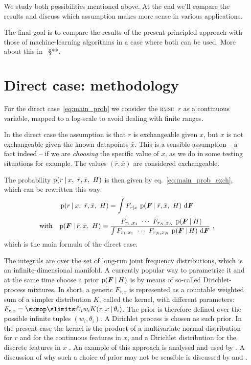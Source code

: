 \documentclass[\ifafour a4paper,12pt,\else a5paper,10pt,\fi%
onecolumn,oneside,article,%
british%
]{memoir}
\makeatletter
\theoremstyle{remark}
\theoremstyle{innote}
\def\sum{\DOTSI\sumop\slimits@}
\newcommand*{\di}{\mathrm{d}}%
\newcommand*{\p}{\mathrm{p}}%
\renewcommand*{\|}[1][]{\nonscript\:#1\vert\nonscript\:\mathopen{}}
\renewcommand*{\=}{\TextOrMath\texteq\eq}
\newcommand*{\sect}{\S}%
\newcommand*{\eqn}{eq.}%
\newcommand*{\wrench}{{\fontencoding{U}\fontfamily{fontawesomethree}\selectfont\symbol{114}}}
\newcommand{\mynote}[1]{ {\color{notecolour}#1}}
\newcommand*{\rmsd}{\textsc{rmsd}}
\newcommand*{\ro}{r}
\newcommand*{\xo}{x}
\newcommand*{\rd}{\bar{r}}
\newcommand*{\xd}{\bar{x}}
\newcommand*{\yF}{\bm{F}}
\makeatother
\begin{document}
We study both possibilities mentioned above. At the end we'll compare the
results and discuss which assumption makes more sense in various
applications.

The final goal is to compare the results of the present principled approach
with those of machine-learning algorithms in a case where both can be used.
More about this in \mynote{\wrench\ \sect***}.


\section{Direct case: methodology}
\label{sec:direct_method}

For the direct case~\eqref{eq:main_prob} we consider the \rmsd\ $r$ as a
continuous variable, mapped to a log-scale to avoid dealing with finite
ranges.

In the direct case the assumption is that $\ro$ is exchangeable given
$\xo$, but $\xo$ is not exchangeable given the known datapoints $\xd$.
This is a sensible assumption -- a fact indeed -- if we are \emph{choosing}
the specific value of $\xo$, as we do in some testing situations for
example. The values $(\rd,\xd)$ are considered exchangeable.

The probability $\p(\ro \| \xo,\ \rd,\xd,\ H)$ is then given by
\eqn~\eqref{eq:main_prob_exch}, which can be rewritten this way:
\begin{equation}
  \label{eq:direct_case_main}
  \begin{gathered}
  \p(\ro \| \xo,\ \rd,\xd,\ H) =
  \int F_{\ro\|\xo} \ \p(\yF \| \rd, \xd,\ H)\ \di\yF
  \\[\jot]
  \text{with}\quad
  \p(\yF \| \rd, \xd,\ H) =
  \frac{
    \ F_{r_{1},x_{1}} \  \dotsm \ 
  F_{r_{N},x_{N}} \ \p(\yF \| H)
  }{
    \int F_{r_{1},x_{1}} \  \dotsm \ 
  F_{r_{N},x_{N}} \ \p(\yF \| H)\ \di\yF
  }  \ ,
\end{gathered}
\end{equation}
which is the main formula of the direct case.

The integrals are over the set of long-run joint frequency distributions,
which is an infinite-dimensional manifold. A currently popular way to
parametrize it and at the same time choose a prior $\p(\yF \| H)$ is by
means of so-called Dirichlet-process mixtures. In short, a generic
$F_{r,x}$ is represented as a countable weighted sum of a simpler
distribution $K$, called the kernel, with different parameters:
$F_{r,x} = \sum_{i}w_{i} K(r,x \| \theta_{i})$. The prior is therefore
defined over the possible infinite tuples $(w_{i},\theta_{i})$. A Dirichlet
process is chosen as such prior. In the present case the kernel is the
product of a multivariate normal distribution for $r$ and for the
continuous features in $x$, and a Dirichlet distribution for the discrete
features in $x$ \parencites[\sect~3.3]{liveranietal2015}. An example of
this approach is analysed and used by \textcites{muelleretal1996}. A
discussion of why such a choice of prior may not be sensible is discussed
by \textcite{petrone2017} and \textcite[\sect~4]{quintanaetal2020}.
\end{document}
